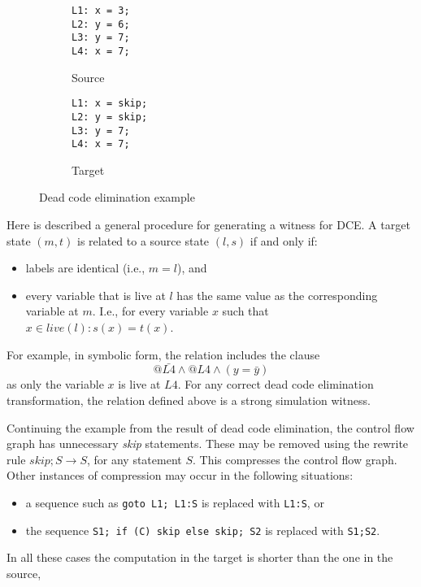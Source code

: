 \begin{figure}[t]
  \begin{mdframed}
  \centering
  \begin{subfigure}[t]{0.49\textwidth}
    \centering
    \begin{lstlisting}
L1: x = 3;
L2: y = 6;
L3: y = 7;
L4: x = 7;
    \end{lstlisting}
    \caption{Source}
    \label{fig:sdce_th}
  \end{subfigure}
  \begin{subfigure}[t]{0.49\textwidth}
    \centering
    \begin{lstlisting}
L1: x = skip;
L2: y = skip;
L3: y = 7;
L4: x = 7;
    \end{lstlisting}
    \caption{Target}
    \label{fig:tdce_th}
  \end{subfigure}
  \end{mdframed}
  \caption{Dead code elimination example}
  \label{fig:dce_th}
\end{figure}

Here is described a general procedure for generating a witness for DCE. A target state $(m, t)$ is related to a source state $(l, s)$ if and only if:
\begin{itemize}
  \item labels are identical (i.e., $m = l$), and
  \item every variable that is live at $l$ has the same value as the corresponding variable at $m$. I.e., for every variable $x$ such that $x \in live(l): s(x) = t(x)$.
\end{itemize}
For example, in symbolic form, the relation includes the clause
\[
  @\bar{L4} \land @L4 \land (y = \bar{y})
\]
as only the variable $x$ is live at $L4$. For any correct dead code elimination transformation, the relation defined above is a strong simulation witness.

Continuing the example from the result of dead code elimination, the control flow graph has unnecessary \emph{skip} statements. These may be removed using the rewrite rule $skip; S \rightarrow S$, for any statement $S$. This compresses the control flow graph. Other instances of compression may occur in the following situations:
\begin{itemize}
  \item a sequence such as \texttt{goto L1; L1:S} is replaced with \texttt{L1:S}, or
\item the sequence \texttt{S1; if (C) skip else skip; S2} is replaced with \texttt{S1;S2}.
\end{itemize}
In all these cases the computation in the target is shorter than the one in the source,

